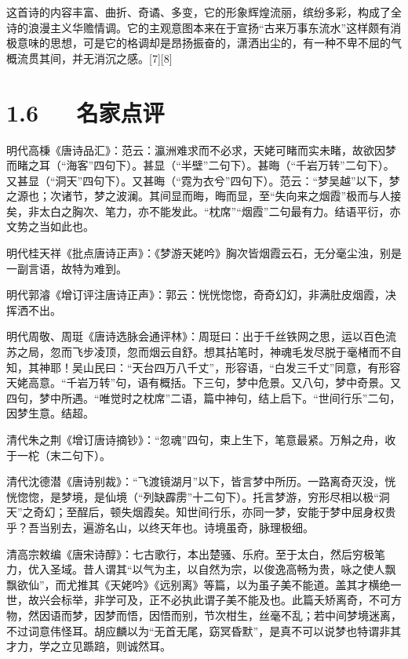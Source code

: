 \documentclass[letterpaper,10pt,english]{sphinxmanual}
\begin{document}
这首诗的内容丰富、曲折、奇谲、多变，它的形象辉煌流丽，缤纷多彩，构成了全诗的浪漫主义华赡情调。它的主观意图本来在于宣扬“古来万事东流水”这样颇有消极意味的思想，可是它的格调却是昂扬振奋的，潇洒出尘的，有一种不卑不屈的气概流贯其间，并无消沉之感。{[}7{]}{[}8{]}


\section{1.6   名家点评}
\label{\detokenize{p01_u6563_u6587/_u674e_u767d-_u68a6_u6e38_u5929_u59e5_u541f_u7559_u522b:id8}}
明代高棅《唐诗品汇》：范云：瀛洲难求而不必求，天姥可睹而实未睹，故欲因梦而睹之耳（“海客”四句下）。甚显（“半壁”二句下）。甚晦（“千岩万转”二句下）。又甚显（“洞天”四句下）。又甚晦（“霓为衣兮”四句下）。范云：“梦吴越”以下，梦之源也；次诸节，梦之波澜。其间显而晦，晦而显，至“失向来之烟霞”极而与人接矣，非太白之胸次、笔力，亦不能发此。“枕席”“烟霞”二句最有力。结语平衍，亦文势之当如此也。

明代桂天祥《批点唐诗正声》：《梦游天姥吟》胸次皆烟霞云石，无分毫尘浊，别是一副言语，故特为难到。

明代郭濬《增订评注唐诗正声》：郭云：恍恍惚惚，奇奇幻幻，非满肚皮烟霞，决挥洒不出。

明代周敬、周珽《唐诗选脉会通评林》：周珽曰：出于千丝铁网之思，运以百色流苏之局，忽而飞步凌顶，忽而烟云自舒。想其拈笔时，神魂毛发尽脱于毫楮而不自知，其神耶！吴山民曰：“天台四万八千丈”，形容语，“白发三千丈”同意，有形容天姥高意。“千岩万转”句，语有概括。下三句，梦中危景。又八句，梦中奇景。又四句，梦中所遇。“唯觉时之枕席”二语，篇中神句，结上启下。“世间行乐”二句，因梦生意。结超。

清代朱之荆《增订唐诗摘钞》：“忽魂”四句，束上生下，笔意最紧。万斛之舟，收于一柁（末二句下）。

清代沈德潜《唐诗别裁》：“飞渡镜湖月”以下，皆言梦中所历。一路离奇灭没，恍恍惚惚，是梦境，是仙境（“列缺霹雳”十二句下）。托言梦游，穷形尽相以极“洞天”之奇幻；至酲后，顿失烟霞矣。知世间行乐，亦同一梦，安能于梦中屈身权贵乎？吾当别去，遍游名山，以终天年也。诗境虽奇，脉理极细。

清高宗敕编《唐宋诗醇》：七古歌行，本出楚骚、乐府。至于太白，然后穷极笔力，优入圣域。昔人谓其“以气为主，以自然为宗，以俊逸高畅为贵，咏之使人飘飘欲仙”，而尤推其《天姥吟》《远别离》等篇，以为虽子美不能道。盖其才横绝一世，故兴会标举，非学可及，正不必执此谓子美不能及也。此篇夭矫离奇，不可方物，然因语而梦，因梦而悟，因悟而别，节次柑生，丝毫不乱；若中间梦境迷离，不过词意伟怪耳。胡应麟以为“无首无尾，窈冥昏默”，是真不可以说梦也特谓非其才力，学之立见踬踣，则诚然耳。
\end{document}
